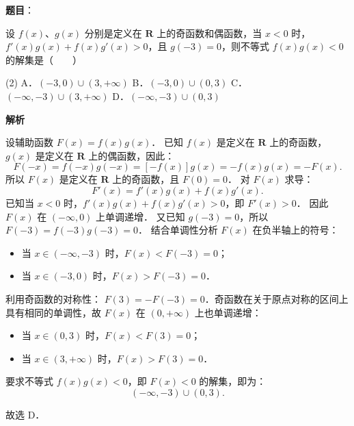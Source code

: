 \begin{answer}

\textbf{题目}：

设 $f(x)$、$g(x)$ 分别是定义在 $\mathbf{R}$ 上的奇函数和偶函数，当 $x < 0$ 时，$f'(x)g(x) + f(x)g'(x) > 0$，且 $g(-3) = 0$，则不等式 $f(x)g(x) < 0$ 的解集是\mbox{（　　）}

\begin{gkopts}(2)
\task A．$(-3, 0) \cup (3, +\infty)$
\task B．$(-3, 0) \cup (0, 3)$
\task C．$(-\infty, -3) \cup (3, +\infty)$
\task D．$(-\infty, -3) \cup (0, 3)$
\end{gkopts}

\textbf{解析}

设辅助函数 $F(x) = f(x)g(x)$．
已知 $f(x)$ 是定义在 $\mathbf{R}$ 上的奇函数，$g(x)$ 是定义在 $\mathbf{R}$ 上的偶函数，因此：
\nopagebreak[4]
\[
F(-x) = f(-x)g(-x) = [-f(x)]g(x) = -f(x)g(x) = -F(x).
\]
所以 $F(x)$ 是定义在 $\mathbf{R}$ 上的奇函数，且 $F(0) = 0$．
对 $F(x)$ 求导：
\nopagebreak[4]
\[
F'(x) = f'(x)g(x) + f(x)g'(x).
\]
已知当 $x < 0$ 时，$f'(x)g(x) + f(x)g'(x) > 0$，即 $F'(x) > 0$．
因此 $F(x)$ 在 $(-\infty, 0)$ 上单调递增．
又已知 $g(-3) = 0$，所以 $F(-3) = f(-3)g(-3) = 0$．
结合单调性分析 $F(x)$ 在负半轴上的符号：
\begin{itemize}
\item 当 $x \in (-\infty, -3)$ 时，$F(x) < F(-3) = 0$；
\item 当 $x \in (-3, 0)$ 时，$F(x) > F(-3) = 0$．
\end{itemize}
利用奇函数的对称性：
$F(3) = -F(-3) = 0$．奇函数在关于原点对称的区间上具有相同的单调性，故 $F(x)$ 在 $(0, +\infty)$ 上也单调递增：
\begin{itemize}
\item 当 $x \in (0, 3)$ 时，$F(x) < F(3) = 0$；
\item 当 $x \in (3, +\infty)$ 时，$F(x) > F(3) = 0$．
\end{itemize}
要求不等式 $f(x)g(x) < 0$，即 $F(x) < 0$ 的解集，即为：
\nopagebreak[4]
\[
(-\infty, -3) \cup (0, 3).
\]

故选 D．


\end{answer}
